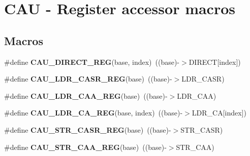 \hypertarget{group__CAU__Register__Accessor__Macros}{}\section{C\+AU -\/ Register accessor macros}
\label{group__CAU__Register__Accessor__Macros}
\subsection*{Macros}
\begin{DoxyCompactItemize}
\item 
\#define {\bfseries C\+A\+U\+\_\+\+D\+I\+R\+E\+C\+T\+\_\+\+R\+EG}(base,  index)~((base)-\/$>$D\+I\+R\+E\+CT\mbox{[}index\mbox{]})\hypertarget{group__CAU__Register__Accessor__Macros_ga7f4eee7e54be5139132863d07547e91e}{}\label{group__CAU__Register__Accessor__Macros_ga7f4eee7e54be5139132863d07547e91e}

\item 
\#define {\bfseries C\+A\+U\+\_\+\+L\+D\+R\+\_\+\+C\+A\+S\+R\+\_\+\+R\+EG}(base)~((base)-\/$>$L\+D\+R\+\_\+\+C\+A\+SR)\hypertarget{group__CAU__Register__Accessor__Macros_gabec32211c73be8204bceca3f0e7f0ad1}{}\label{group__CAU__Register__Accessor__Macros_gabec32211c73be8204bceca3f0e7f0ad1}

\item 
\#define {\bfseries C\+A\+U\+\_\+\+L\+D\+R\+\_\+\+C\+A\+A\+\_\+\+R\+EG}(base)~((base)-\/$>$L\+D\+R\+\_\+\+C\+AA)\hypertarget{group__CAU__Register__Accessor__Macros_gafb3070ebf83b68deba5d119812b501ea}{}\label{group__CAU__Register__Accessor__Macros_gafb3070ebf83b68deba5d119812b501ea}

\item 
\#define {\bfseries C\+A\+U\+\_\+\+L\+D\+R\+\_\+\+C\+A\+\_\+\+R\+EG}(base,  index)~((base)-\/$>$L\+D\+R\+\_\+\+CA\mbox{[}index\mbox{]})\hypertarget{group__CAU__Register__Accessor__Macros_ga23cfae3a6a7b964e68b5174b377bd276}{}\label{group__CAU__Register__Accessor__Macros_ga23cfae3a6a7b964e68b5174b377bd276}

\item 
\#define {\bfseries C\+A\+U\+\_\+\+S\+T\+R\+\_\+\+C\+A\+S\+R\+\_\+\+R\+EG}(base)~((base)-\/$>$S\+T\+R\+\_\+\+C\+A\+SR)\hypertarget{group__CAU__Register__Accessor__Macros_gab82f8d15e353c9d00fe1268b550932cf}{}\label{group__CAU__Register__Accessor__Macros_gab82f8d15e353c9d00fe1268b550932cf}

\item 
\#define {\bfseries C\+A\+U\+\_\+\+S\+T\+R\+\_\+\+C\+A\+A\+\_\+\+R\+EG}(base)~((base)-\/$>$S\+T\+R\+\_\+\+C\+AA)\hypertarget{group__CAU__Register__Accessor__Macros_ga14c1d13dc797abdc0a5d161637b1925c}{}\label{group__CAU__Register__Accessor__Macros_ga14c1d13dc797abdc0a5d161637b1925c}


\end{DoxyCompactItemize}
